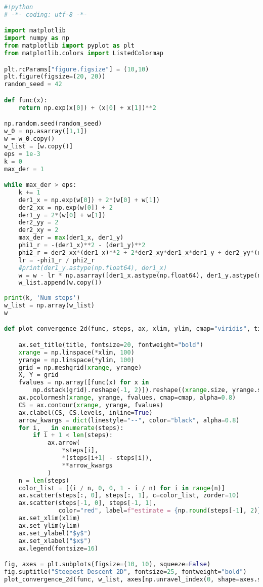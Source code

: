 \documentclass [12pt]{article}
\begin{document}
\begin{lstlisting}[language=python]
#!python
# -*- coding: utf-8 -*-

import matplotlib
import numpy as np
from matplotlib import pyplot as plt
from matplotlib.colors import ListedColormap

plt.rcParams["figure.figsize"] = (10,10)
plt.figure(figsize=(20, 20))
random_seed = 42

def func(x):
    return np.exp(x[0]) + (x[0] + x[1])**2

np.random.seed(random_seed)
w_0 = np.asarray([1,1])
w = w_0.copy()
w_list = [w.copy()]
eps = 1e-3
k = 0
max_der = 1

while max_der > eps:
    k += 1
    der1_x = np.exp(w[0]) + 2*(w[0] + w[1])
    der2_xx = np.exp(w[0]) + 2
    der1_y = 2*(w[0] + w[1])
    der2_yy = 2
    der2_xy = 2
    max_der = max(der1_x, der1_y)
    phi1_r = -(der1_x)**2 - (der1_y)**2
    phi2_r = der2_xx*(der1_x)**2 + 2*der2_xy*der1_x*der1_y + der2_yy*(der1_y)**2
    lr = -phi1_r / phi2_r
    #print(der1_y.astype(np.float64), der1_x)
    w = w - lr * np.asarray([der1_x.astype(np.float64), der1_y.astype(np.float64)])
    w_list.append(w.copy())
    
print(k, 'Num steps')
w_list = np.array(w_list)
w

def plot_convergence_2d(func, steps, ax, xlim, ylim, cmap="viridis", title=""):

    ax.set_title(title, fontsize=20, fontweight="bold")
    xrange = np.linspace(*xlim, 100)
    yrange = np.linspace(*ylim, 100)
    grid = np.meshgrid(xrange, yrange)
    X, Y = grid
    fvalues = np.array([func(x) for x in
        np.dstack(grid).reshape(-1, 2)]).reshape((xrange.size, yrange.size))
    ax.pcolormesh(xrange, yrange, fvalues, cmap=cmap, alpha=0.8)
    CS = ax.contour(xrange, yrange, fvalues)
    ax.clabel(CS, CS.levels, inline=True)
    arrow_kwargs = dict(linestyle="--", color="black", alpha=0.8)
    for i, _ in enumerate(steps):
        if i + 1 < len(steps):
            ax.arrow(
                *steps[i],
                *(steps[i+1] - steps[i]),
                **arrow_kwargs
            )
    n = len(steps)
    color_list = [(i / n, 0, 0, 1 - i / n) for i in range(n)]
    ax.scatter(steps[:, 0], steps[:, 1], c=color_list, zorder=10)
    ax.scatter(steps[-1, 0], steps[-1, 1], 
               color="red", label=f"estimate = {np.round(steps[-1], 2)}")
    ax.set_xlim(xlim)
    ax.set_ylim(ylim)
    ax.set_ylabel("$y$")
    ax.set_xlabel("$x$")
    ax.legend(fontsize=16)

fig, axes = plt.subplots(figsize=(10, 10), squeeze=False)
fig.suptitle("Steepest Descent 2D", fontsize=25, fontweight="bold")
plot_convergence_2d(func, w_list, axes[np.unravel_index(0, shape=axes.shape)], (-6, 1.1), (-1.1, 6))

\end{lstlisting}
\end{document}

